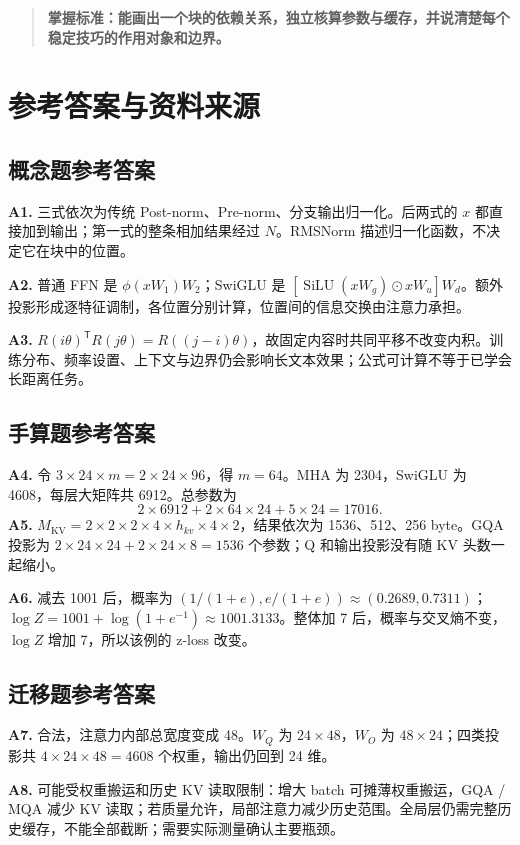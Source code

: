 \documentclass[UTF8,fontset=fandol,zihao=-4,a4paper]{ctexart}
\newcommand{\focus}[1]{\begin{quote}\small\color{accent}\bfseries #1\end{quote}}
\newcommand{\nextpage}{\clearpage}
\begin{document}
\focus{掌握标准：能画出一个块的依赖关系，独立核算参数与缓存，并说清楚每个稳定技巧的作用对象和边界。}

\nextpage
\section{参考答案与资料来源}\label{sec:answers}

\subsection{概念题参考答案}
\textbf{A1.} 三式依次为传统 Post-norm、Pre-norm、分支输出归一化。后两式的 $x$ 都直接加到输出；第一式的整条相加结果经过 $N$。RMSNorm 描述归一化函数，不决定它在块中的位置。

\textbf{A2.} 普通 FFN 是 $\phi(xW_1)W_2$；SwiGLU 是 $[\operatorname{SiLU}(xW_g)\odot xW_u]W_d$。额外投影形成逐特征调制，各位置分别计算，位置间的信息交换由注意力承担。

\textbf{A3.} $R(i\theta)^{\mathsf T}R(j\theta)=R((j-i)\theta)$，故固定内容时共同平移不改变内积。训练分布、频率设置、上下文与边界仍会影响长文本效果；公式可计算不等于已学会长距离任务。

\subsection{手算题参考答案}
\textbf{A4.} 令 $3\times24\times m=2\times24\times96$，得 $m=64$。MHA 为 2304，SwiGLU 为 4608，每层大矩阵共 6912。总参数为
\[
2\times6912+2\times64\times24+5\times24=17016.
\]
\textbf{A5.} $M_{\mathrm{KV}}=2\times2\times2\times4\times h_{kv}\times4\times2$，结果依次为 1536、512、256 byte。GQA 投影为 $2\times24\times24+2\times24\times8=1536$ 个参数；Q 和输出投影没有随 KV 头数一起缩小。

\textbf{A6.} 减去 1001 后，概率为 $(1/(1+e),e/(1+e))\approx(0.2689,0.7311)$；$\log Z=1001+\log(1+e^{-1})\approx1001.3133$。整体加 7 后，概率与交叉熵不变，$\log Z$ 增加 7，所以该例的 z-loss 改变。

\subsection{迁移题参考答案}
\textbf{A7.} 合法，注意力内部总宽度变成 48。$W_Q$ 为 $24\times48$，$W_O$ 为 $48\times24$；四类投影共 $4\times24\times48=4608$ 个权重，输出仍回到 24 维。

\textbf{A8.} 可能受权重搬运和历史 KV 读取限制：增大 batch 可摊薄权重搬运，GQA / MQA 减少 KV 读取；若质量允许，局部注意力减少历史范围。全局层仍需完整历史缓存，不能全部截断；需要实际测量确认主要瓶颈。
\end{document}
